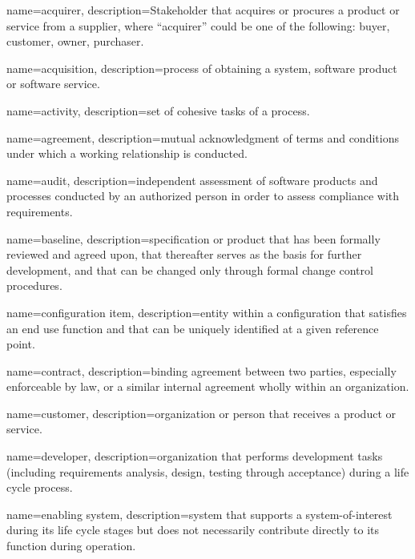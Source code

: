 {
	name=acquirer,
	description={Stakeholder that acquires or procures a product or service from a supplier, where ``acquirer'' could be one of the following: buyer, customer, owner, purchaser.}
}

{
	name=acquisition,
	description={process of obtaining a system, software product or software service.}
}

{
	name=activity,
	description={set of cohesive tasks of a process.}
}

{
	name=agreement,
	description={mutual acknowledgment of terms and conditions under which a working relationship is conducted.}
}

{
	name=audit,
	description={independent assessment of software products and processes conducted by an authorized person in order to assess compliance with requirements.}
}



{
	name=baseline,
	description={specification or product that has been formally reviewed and agreed upon, that thereafter serves as the basis for further development, and that can be changed only through formal change control procedures.}
}



{
	name=configuration item,
	description={entity within a configuration that satisfies an end use function and that can be uniquely identified at a given reference point.}	
}

{
	name=contract,
	description={binding agreement between two parties, especially enforceable by law, or a similar internal agreement wholly within an organization.}
}

{
	name=customer,
	description={organization or person that receives a product or service.}
}



{
	name=developer,
	description={organization that performs development tasks (including requirements analysis, design, testing through acceptance) during a life cycle process.}
}



{
	name=enabling system,
	description={system that supports a system-of-interest during its life cycle stages but does not necessarily contribute directly to its function during operation.}
}

